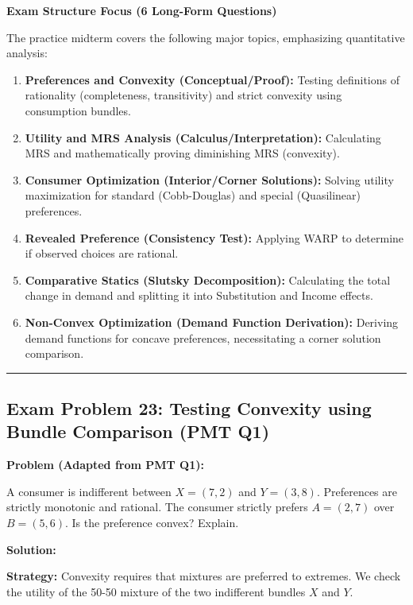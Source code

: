 \documentclass{article}
\begin{document}
\textbf{Exam Structure Focus (6 Long-Form Questions)}

The practice midterm covers the following major topics, emphasizing quantitative analysis:

\begin{enumerate}
\item \textbf{Preferences and Convexity (Conceptual/Proof):} Testing definitions of rationality (completeness, transitivity) and strict convexity using consumption bundles.
\item \textbf{Utility and MRS Analysis (Calculus/Interpretation):} Calculating MRS and mathematically proving diminishing MRS (convexity).
\item \textbf{Consumer Optimization (Interior/Corner Solutions):} Solving utility maximization for standard (Cobb-Douglas) and special (Quasilinear) preferences.
\item \textbf{Revealed Preference (Consistency Test):} Applying WARP to determine if observed choices are rational.
\item \textbf{Comparative Statics (Slutsky Decomposition):} Calculating the total change in demand and splitting it into Substitution and Income effects.
\item \textbf{Non-Convex Optimization (Demand Function Derivation):} Deriving demand functions for concave preferences, necessitating a corner solution comparison.
\end{enumerate}

\vspace{1em}\hrule\vspace{1em}

\subsection*{Exam Problem 23: Testing Convexity using Bundle Comparison (PMT Q1)}

\textbf{Problem (Adapted from PMT Q1):}

A consumer is indifferent between $X=(7, 2)$ and $Y=(3, 8)$. Preferences are strictly monotonic and rational. The consumer strictly prefers $A=(2, 7)$ over $B=(5, 6)$. Is the preference convex? Explain.

\textbf{Solution:}

\textbf{Strategy:} Convexity requires that mixtures are preferred to extremes. We check the utility of the 50-50 mixture of the two indifferent bundles $X$ and $Y$.
\end{document}
